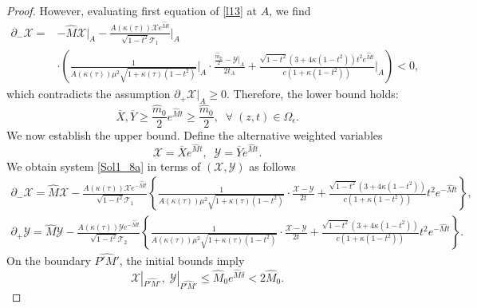 \documentclass[3p,11pt]{elsarticle}
\numberwithin{equation}{section}
\begin{document}
\begin{proof}
     However, evaluating first equation of \eqref{l13} at $A$, we find
     \begin{equation*}\label{l14}
         \begin{split}
             \partial_-\mathcal{X} = &-\hat M \mathcal{X}|_A-\frac{A(\kappa(\tau))\mathcal{X}e^{\hat M t}}{\sqrt{1-t^2}\mathcal{T}_1}\Bigg|_A \\ & \cdot\left(\frac{1}{A(\kappa(\tau))\mu^2\sqrt{1+\kappa(\tau)(1-t^2)}}\Bigg|_A\cdot\frac{\frac{\hat m_0}{2}- \mathcal{Y}|_A}{2t_A}+\frac{\sqrt{1-t^2}(3+4\kappa(1-t^2))t^2e^{\hat M t}}{c(1+\kappa(1-t^2))}\Bigg|_A\right)<0,
         \end{split}
     \end{equation*} 
      which contradicts the assumption $\partial_+\mathcal{X}|_A\geq 0$. Therefore, the lower bound holds:
    \begin{equation}\label{l15}
        \overline{X}, \overline{Y} \geq \frac{\hat m_0}{2}e^{\hat M t}\geq \frac{\hat m_0}{2}, \;\; \forall \; (z,t)\in \Omega_\epsilon.
    \end{equation}
    We now establish the upper bound. Define the alternative weighted variables
    \begin{equation*}\label{l16}
        \mathcal{X}=\overline{X}e^{\hat M t}, \;\;  \mathcal{Y}=\overline{Y}e^{\hat M t}.
    \end{equation*}
    We obtain system \eqref{Sol1_8a} in terms of $(\mathcal{X},\mathcal{Y})$  as follows
    \begin{equation}\label{l17} 
        \begin{split}
            \partial_-\mathcal{X} = \hat M \mathcal{X}-\frac{A(\kappa(\tau))\mathcal{X}e^{-\hat M t}}{\sqrt{1-t^2}\mathcal{T}_1} \left\{\frac{1}{A(\kappa(\tau))\mu^2\sqrt{1+\kappa(\tau)(1-t^2)}}\cdot\frac{\mathcal{X}- \mathcal{Y}}{2t}+\frac{\sqrt{1-t^2}(3+4\kappa(1-t^2))}{c(1+\kappa(1-t^2))}t^2e^{-\hat M t}\right\},\\
             \partial_+\mathcal{Y} =\hat M \mathcal{Y}-\frac{A(\kappa(\tau)) \mathcal{Y}e^{-\hat M t}}{\sqrt{1-t^2}\mathcal{T}_2} \left\{\frac{1}{A(\kappa(\tau))\mu^2\sqrt{1+\kappa(\tau)(1-t^2)}}\cdot\frac{\mathcal{X}- \mathcal{Y}}{2t}+\frac{\sqrt{1-t^2}(3+4\kappa(1-t^2))}{c(1+\kappa(1-t^2))}t^2e^{-\hat M t}\right\}.
        \end{split}
    \end{equation}  
    On the boundary $\widehat{P'M'}$, the initial bounds imply
    \begin{equation*}\label{l18}
        \mathcal{X}|_{\widehat{P'M'}}, \; \mathcal{Y}|_{\widehat{P'M'}} \leq \hat M_0e^{\hat M \delta}< 2\hat M_0.
    \end{equation*}


\end{proof}
\end{document}
